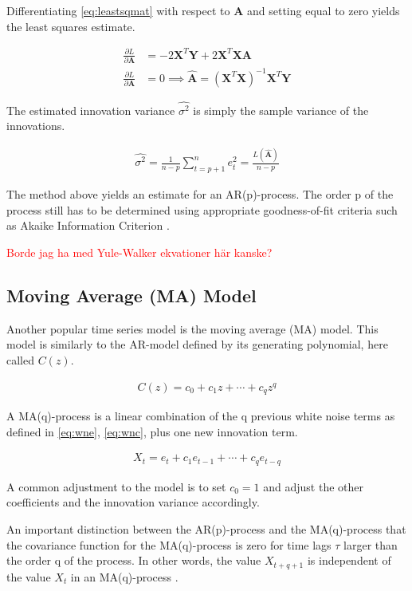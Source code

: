 Differentiating \ref{eq:leastsqmat} with respect to $\mathbf{A}$ and setting equal to zero yields the least squares estimate. 

\begin{align}
    \frac{\partial L}{\partial \mathbf{A}} &= -2 \mathbf{X}^T \mathbf{Y} + 2\mathbf{X}^T \mathbf{X} \mathbf{A} \\
    \frac{\partial L}{\partial \mathbf{A}} &= 0 \implies \hat{\mathbf{A}} = (\mathbf{X}^T \mathbf{X})^{-1} \mathbf{X}^T \mathbf{Y}
 \end{align}

The estimated innovation variance $\hat{\sigma^2}$ is simply the sample variance of the innovations.

\begin{align}
    \hat{\sigma^2} =\frac{1}{n-p} \sum_{t=p+1}^n e_t^2 = \frac{L(\hat{\mathbf{A}})}{n-p}
\end{align}

The method above yields an estimate for an AR(p)-process. The order p of the process still has to be determined using appropriate goodness-of-fit criteria such as Akaike Information Criterion \citep{lindgren2014stationary}. 


\textcolor{red}{Borde jag ha med Yule-Walker ekvationer här kanske? }

\subsection{Moving Average (MA) Model}

Another popular time series model is the moving average (MA) model. This model is similarly to the AR-model defined by its generating polynomial, here called $C(z)$. 

\begin{align}
    C(z) = c_0 + c_1 z + \cdots + c_q z^q 
\end{align}

A MA(q)-process is a linear combination of the q previous white noise terms as defined in \ref{eq:wne}, \ref{eq:wnc}, plus one new innovation term. 

\begin{align}
    X_t = e_t + c_1 e_{t-1} + \cdots + c_q e_{t-q}
\end{align}

A common adjustment to the model is to set $c_0 = 1$ and adjust the other coefficients and the innovation variance accordingly. 

An important distinction between the AR(p)-process and the MA(q)-process that the covariance function for the MA(q)-process is zero for time lags $\tau$ larger than the order q of the process. In other words, the value $X_{t+q + 1}$ is independent of the value $X_t$ in an MA(q)-process \citep{lindgren2014stationary}. 


